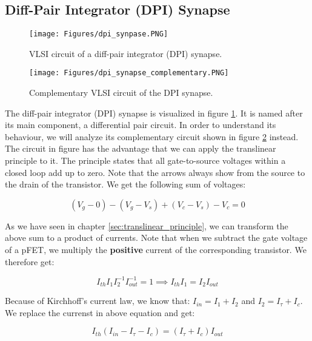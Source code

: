 \subsection{Diff-Pair Integrator (DPI) Synapse}

\begin{figure}
    \centering
    \texttt{[image: Figures/dpi\_synpase.PNG]}
    \caption{VLSI circuit of a diff-pair integrator (DPI) synapse.}
    \label{fig:dpi_synapse}
\end{figure}

\begin{figure}
    \centering
    \texttt{[image: Figures/dpi\_synapse\_complementary.PNG]}
    \caption{Complementary VLSI circuit of the DPI synapse.}
    \label{fig:dpi_synapse_complementary}
\end{figure}

The diff-pair integrator (DPI) synapse is visualized in figure \ref{fig:dpi_synapse}. It is named after its main component, a differential pair circuit. In order to understand its behaviour, we will analyze its complementary circuit shown in figure \ref{fig:dpi_synapse_complementary} instead. The circuit in figure  has the advantage that we can apply the translinear principle to it. The principle states that all gate-to-source voltages within a closed loop add up to zero. Note that the arrows always show from the source to the drain of the transistor. We get the following sum of voltages:

\begin{equation}
    (V_g - 0) - (V_g - V_s) + (V_c - V_s) - V_c = 0
\end{equation}

As we have seen in chapter \ref{sec:translinear_principle}, we can transform the above sum to a product of currents. Note that when we subtract the gate voltage of a pFET, we multiply the \textbf{positive} current of the corresponding transistor. We therefore get:

\begin{equation}
    I_{th} I_1 I_2^{-1} I_{out}^{-1} = 1 \implies I_{th} I_1 = I_2 I_{out}
\end{equation}

Because of Kirchhoff's current law, we know that: $I_{in} = I_1 + I_2$ and $I_2 = I_{\tau} + I_c$. We replace the currenst in above equation and get:

\begin{equation}
    I_{th} (I_{in} - I_{\tau} - I_c) = (I_{\tau} + I_c) I_{out}\label{eq:dpi_1}
\end{equation}


